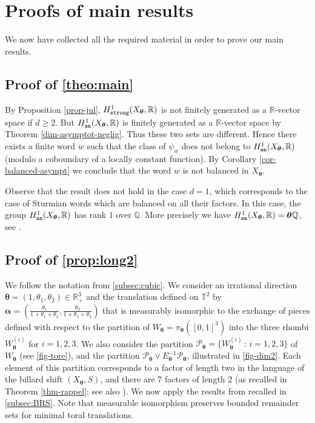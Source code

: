 \documentclass{article}
\newcommand{\tcb}{\textcolor{blue}}
\theoremstyle{definition}
\newcommand{\T}{\mathbb{T}}
\newcommand{\btheta}{\boldsymbol{\theta}}
\newcommand{\balpha}{\boldsymbol{\alpha}}
\begin{document}




\section{Proofs of main results}
We now have collected all the required material in order to prove  our main results.
\subsection{Proof of   \cref{theo:main}} \label{subsec:proofmain}

 By Proposition \ref{prop-jul}, $H^1_{\tt{strong}}(X_{\btheta},\mathbb R)$ is not finitely  generated as a ${\mathbb R}$-vector space if $d\geq 2$.  But  $H^1_{\tt{an}} (X_{\btheta},\mathbb R)$  is finitely  generated as a ${\mathbb R}$-vector space  by Theorem \ref{dim-asymptot-neglig}. Thus these  two sets are different.  Hence there exists 
a finite word $w$ such  that  the class  of $\psi_w  $  does not belong to   $H^1_{\tt{an}} (X_{\btheta},\mathbb R)$  (modulo  a coboundary of a  locally constant function). By Corollary \ref{cor-balanced-asympt} we conclude that the word  $w$ is not balanced  in $X_{\btheta}$.


Observe that the result does not  hold in the case $d=1$, which corresponds to the case of  Sturmian words which are balanced  on all their factors. In this case,  the group $H^1_{\tt{an}}(X_{\btheta},\mathbb R)$ has rank  $1$ over  ${\mathbb Q}$. More precisely we have $H^1_{\tt{an}}(X_{\btheta},\mathbb R)= \btheta {\mathbb Q}$, see \cite{For.Hunt.Kellen.02}.%





\subsection{Proof of  \cref{prop:long2}} \label{subsec:proof2}

We follow the notation from \cref{subsec:cubic}.
We consider an  irrational   direction $\btheta=(1,\theta_1,\theta_2)\in \mathbb R^3_+$ and  the translation defined  on $\T^2$ by $\balpha=(\frac{\theta_1}{1+\theta_1+\theta_2},\frac{\theta_2}{1+\theta_1+\theta_2})$ that is  measurably  isomorphic  to the exchange of pieces   defined with respect to  the  partition  of $W_{\btheta}= \pi_{\btheta} ([0,1]^3)$ into  the three rhombi $W_{\btheta}^{(i)}$ for $ i=1,2,3$.  
We also consider the partition $\mathcal P_{\btheta}= \{W_{\btheta}^{(i)}\,:\, i=1,2,3\}$ of $W_{\btheta}$  (see  \cref{fig-tore}), and the partition $\mathcal P _{\btheta} \vee E^{-1}_{\btheta}\mathcal P_{\btheta}$, illustrated in \cref{fig-dim2}.  Each element of this partition corresponds to a factor of length two in the language of the billard shift $(X_{\btheta},S)$, and there are 7  factors of length $2$ (as recalled  in Theorem \ref{thm-rappel}; see also  \cite{Bary.95, Bed:09}).
We now apply the results  from \cite{GL:15} recalled in \cref{subsec:BRS}. Note that  measurable isomorphism  preserves bounded remainder sets for minimal  toral translations. %
\end{document}
